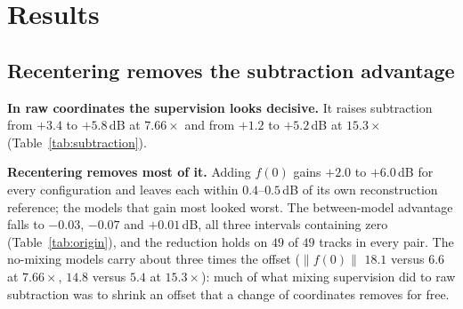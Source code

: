 \documentclass[conference]{IEEEtran}
\newcommand{\tabref}[1]{Table~\ref{#1}}
\begin{document}
\section{Results}\label{sec:results}

\subsection{Recentering removes the subtraction advantage}\label{sec:subtraction}

\begin{table}[t]
  \centering\small
  \setlength{\tabcolsep}{2.2pt}
  
  \caption{Stem removal by latent subtraction (SI-SDR, dB; MUSDB18 test,
  5{,}880 units from 49 tracks). ``$+f(0)$'' rows read the \emph{same}
  checkpoint in recentered coordinates. ``gap'' is the linearity tax against
  each model's own encode--decode reconstruction of the residual (lower is
  better). M2L denotes Music2Latent after mixed-latent fine-tuning.}
  \label{tab:subtraction}
\end{table}

\begin{table}[t]
  \centering\small
  \setlength{\tabcolsep}{3.0pt}
  
  \caption{The intervention on fixed checkpoints. Advantage in
  stem-subtraction SI-SDR (dB) of each mixing-trained model over its matched
  no-mixing control, raw and recentered, with the 95\% recording-bootstrap
  interval of the recentered advantage and the number of tracks on which the
  gap magnitude shrinks. No retraining, same units, same audio.}
  \label{tab:origin}
\end{table}

\textbf{In raw coordinates the supervision looks decisive.} It raises
subtraction from $+3.4$ to $+5.8$\,dB at $7.66\times$ and from $+1.2$ to
$+5.2$\,dB at $15.3\times$ (\tabref{tab:subtraction}).

\textbf{Recentering removes most of it.} Adding $f(0)$ gains $+2.0$ to
$+6.0$\,dB for every configuration and leaves each within $0.4$--$0.5$\,dB of
its own reconstruction reference; the models that gain most looked worst. The
between-model advantage falls to $-0.03$, $-0.07$ and $+0.01$\,dB, all three
intervals containing zero (\tabref{tab:origin}), and the reduction holds on
$49$ of $49$ tracks in every pair. The no-mixing models
carry about three times the offset ($\lVert f(0)\rVert$ $18.1$ versus $6.6$
at $7.66\times$, $14.8$ versus $5.4$ at $15.3\times$): much of what mixing
supervision did to raw subtraction was to shrink an offset that a change of
coordinates removes for free.
\end{document}
